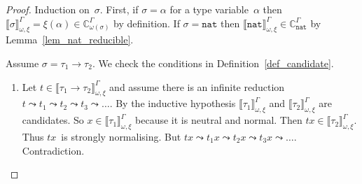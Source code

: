 \documentclass[runningheads,a4paper]{llncs}
\newcommand{\nat}{\mathtt{nat}}
\newcommand{\Cb}{\mathbb{C}}
\newcommand{\val}[3]{\ensuremath{\llbracket#1\rrbracket_{#2}^{#3}}}
\begin{document}
\begin{proof}
  Induction on~$\sigma$. First, if $\sigma = \alpha$ for a type
  variable~$\alpha$ then
  $\val{\sigma}{\omega,\xi}{\Gamma} = \xi(\alpha) \in
  \Cb_{\omega(\sigma)}^\Gamma$ by definition. If $\sigma = \nat$ then
  $\val{\nat}{\omega,\xi}{\Gamma} \in \Cb_{\nat}^\Gamma$ by
  Lemma~\ref{lem_nat_reducible}.

  Assume $\sigma = \tau_1 \to \tau_2$. We check the conditions in
  Definition~\ref{def_candidate}.
  \begin{enumerate}
  \item Let $t \in \val{\tau_1\to\tau_2}{\omega,\xi}{\Gamma}$ and
    assume there is an infinite reduction
    $t \leadsto t_1 \leadsto t_2 \leadsto t_3 \leadsto \ldots$. By the
    inductive hypothesis $\val{\tau_1}{\omega,\xi}{\Gamma}$ and
    $\val{\tau_2}{\omega,\xi}{\Gamma}$ are candidates. So
    $x \in \val{\tau_1}{\omega,\xi}{\Gamma}$ because it is neutral and
    normal. Then $t x \in \val{\tau_2}{\omega,\xi}{\Gamma}$. Thus
    $t x$~is strongly normalising. But
    $t x \leadsto t_1 x \leadsto t_2 x \leadsto t_3 x \leadsto
    \ldots$. Contradiction.


\end{enumerate}
\end{proof}
\end{document}
